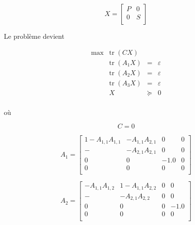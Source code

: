  \begin{equation}
X=\left[
\begin{array}{cc}
P &  0\\
0&  S \\
\end{array}
\right]
\end{equation}

Le problème devient
 
 \begin{equation}
\begin{array}{rrcl}
\max  & \mbox{tr}\; (CX)  & & \\
     &\mbox{tr}\;(A_{1}X)&=& \varepsilon \\
     &\mbox{tr}\;(A_{2}X)&=&\varepsilon \\
     &\mbox{tr}\;(A_{3}X)&=& \varepsilon \\
      & X       & \succeq & 0 \\
     
\end{array}
\end{equation}

où 

\begin{equation}
C=0
\end{equation}

\begin{equation}
A_{1}=\left[
\begin{array}{cccc}
1-  A_{1,1} A_{1,1}  &- A_{1,1} A_{2,1} & 0 & 0 \\
- & -A_{2,1} A_{2,1} & 0 & 0 \\
0    &   0  & -1.0 & 0 \\
0    &   0  &  0   & 0 \\
\end{array}
\right]
\end{equation}


\begin{equation}
A_{2}=\left[
\begin{array}{cccc}
-A_{1,1} A_{1,2}& 1- A_{1,1} A_{2,2} & 0 & 0 \\
- & -A_{2,1} A_{2,2} & 0 & 0 \\
0    &   0  &  0 & -1.0 \\
0    &   0  &  0   & 0 \\
\end{array}
\right]
\end{equation}


